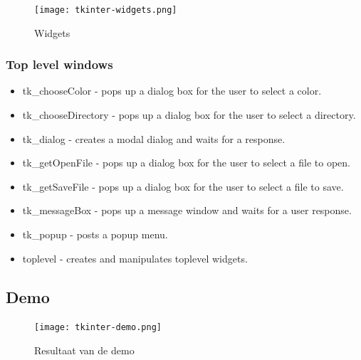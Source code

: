 \documentclass{article}
\begin{document}
\begin{figure}[H]
    \centering
    \texttt{[image: tkinter-widgets.png]}
    \caption{Widgets}
\end{figure}

\subsubsection{Top level windows}

\begin{itemize}
    \item tk\_chooseColor - pops up a dialog box for the user to select a color.
    \item tk\_chooseDirectory - pops up a dialog box for the user to select a directory.
    \item tk\_dialog - creates a modal dialog and waits for a response.
    \item tk\_getOpenFile - pops up a dialog box for the user to select a file to open.
    \item tk\_getSaveFile - pops up a dialog box for the user to select a file to save.
    \item tk\_messageBox - pops up a message window and waits for a user response.
    \item tk\_popup - posts a popup menu.
    \item toplevel - creates and manipulates toplevel widgets.
\end{itemize}

\subsection{Demo}

\begin{figure}[H]
    \centering
    \texttt{[image: tkinter-demo.png]}
    \caption{Resultaat van de demo}
\end{figure}
\end{document}
